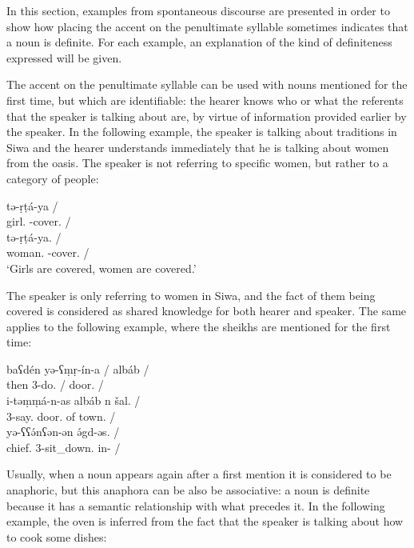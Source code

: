 \documentclass[output=paper]{langsci/langscibook}
\begin{document}
In this section, examples from spontaneous discourse are presented in order to show how placing the accent on the penultimate syllable sometimes indicates that a noun is definite. For each example, an explanation of the kind of definiteness expressed will be given.

The accent on the penultimate syllable can be used with nouns mentioned for the first time, but which are identifiable: the hearer knows who or what the referents that the speaker is talking about are, by virtue of information provided earlier by the speaker. In the following example, the speaker is talking about traditions in Siwa and the hearer understands immediately that he is talking about women from the oasis. The speaker is not referring to specific women, but rather to a category of people:

\begin{exe}
\ex\label{5ex:16}
 tə-ṛṭá-ya / \\
	girl.{} {}-cover.{} /  \\
\glt
\exi{}
 tə-ṛṭá-ya. / \\
	woman.{} {}-cover.{} / \\
\glt	`Girls are covered, women are covered.'
\end{exe}

{
The speaker is only referring to women in Siwa, and the fact of them being covered is considered as shared knowledge for both hearer and speaker. The same applies to the following example, where the sheikhs are mentioned for the first time:
}

\begin{exe}
\ex\label{5ex:17}
\gll	baʕdén	yə-ʕṃṛ-ín-a	/	albáb	/ \\
	then	3-do.{}	/	door.{}	/ \\
\glt
\exi{}
\gll	i-təṃṃá-n-as	albáb	n	šal.	/ \\
	3-say.{}	door.{}	of	town.{}	/ \\
\glt
\exi{}
	yə-ʕʕə́nʕən-ən	ə́gd-əs.	/	\\
	chief.{}	3-sit\_down.{}	in-{}	/	\\
\end{exe}

Usually, when a noun appears again after a first mention it is considered to be anaphoric, but this anaphora can be also be associative: a noun is definite because it has a semantic relationship with what precedes it. In the following example, the oven is inferred from the fact that the speaker is talking about how to cook some dishes:
\end{document}
